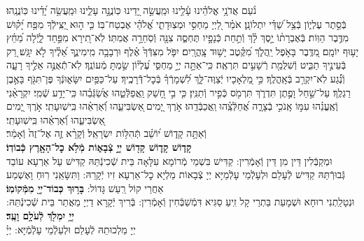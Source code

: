 \documentclass[twoside, openany, parskip=half, 11pt]{book}
\begin{document}
\begin{sometimes}
	
	
	\halfkaddish
	
	
	\label{vihi noam}
	
	נֹ֨עַם אֲדֹנָ֥י אֱלֹהֵ֗ינוּ עָ֫לֵ֥ינוּ וּמַֽעֲשֵׂ֣ה יָ֭דֵינוּ כּֽוֹנֲנָ֣ה עָלֵ֑ינוּ וּמַֽעֲשֵׂ֥ה יָ֝דֵ֗ינוּ כּֽוֹנֲנֵֽהוּ׃\\
	בְּֿסֵ֣תֶר עֶלְי֑וֹן בְּֿצֵ֥ל שַׁ֝דַּ֗י יִתְלוֹנָֽן׃
	אֹמַ֗ר לַ֭יְיָ מַחְסִ֣י וּמְצֽוּדָתִ֑י אֱ֝לֹהַ֗י אֶבְטַח־בּֽוֹ׃
	כִּ֤י ה֣וּא יַ֭צִּֽילְֿךָ מִפַּ֥ח יָ֝ק֗וּשׁ מִדֶּ֥בֶר הַוּֽוֹת׃
	בְּֿאֶבְרָת֨וֹ יָ֣סֶךְ לָ֗ךְ וְֿתַ֣חַת כְּֿנָפָ֣יו תֶּחְסֶ֑ה צִנָּ֖ה וְֿסֹֽחֵרָ֣ה אֲמִתּֽוֹ׃
	לֹֽא־תִ֭ירָא מִפַּ֣חַד לָ֑יְֿלָה מֵ֝חֵ֗ץ יָע֥וּף יוֹמָֽם׃
	מִ֭דֶּֽבֶר בָּאֹ֣פֶל יַֽהֲלֹ֑ךְ מִ֝קֶּ֗טֶב יָשׁ֥וּד צָֽהֳרָֽיִם׃
	יִפֹּ֤ל מִצִּדְּֿךָ֙ אֶ֗לֶף וּרְבָבָ֥ה מִֽימִינֶ֑ךָ אֵ֝לֶ֗יךָ לֹ֣א יִגָּֽשׁ׃
	רַ֭ק בְּֿעֵינֶ֣יךָ תַבִּ֑יט וְֿשִׁלֻּמַ֖ת רְֿשָׁעִ֣ים תִּרְאֶֽה׃
	כִּֽי־אַתָּ֣ה יְיָ֣ מַחְסִּ֑י עֶ֝לְי֗וֹן שַׂ֣מְתָּ מְֿעוֹנֶֽךָ׃
	לֹֽא־תְֿֿאֻנֶּ֣ה אֵלֶ֣יךָ רָעָ֑ה וְֿנֶ֗֝גַע לֹֽא־יִקְרַ֥ב בְּֿאָֽהֳלֶֽךָ׃
	כִּ֣י מַ֭לְאָכָיו יְֿצַוֶּה־לָּ֑ךְ לִ֝שְׁמָרְֿךָ֗ בְּֿכׇל־דְּֿֿרָכֶֽיךָ׃
	עַל־כַּפַּ֥יִם יִשָּׂא֑וּנְֿךָ פֶּן־תִּגֹּ֖ף בָּאֶ֣בֶן רַגְלֶֽךָ׃
	עַל־שַׁ֣חַל וָפֶ֣תֶן תִּדְרֹ֑ךְ תִּרְמֹ֖ס כְּֿפִ֣יר וְֿתַנִּֽין׃
	כִּ֤י בִ֣י חָ֭שַׁק וַֽאֲפַלְּֿטֵ֑הוּ אֲשַׂ֝גְּֿבֵ֗הוּ כִּֽי־יָדַ֥ע שְֿׁמִֽי׃
	יִקְרָאֵ֨נִי וְֽֿאֶֽעֱנֵ֗הוּ עִמּ֣וֹ אָֽנֹכִ֣י בְֿצָרָ֑ה אֲ֝חַלְּֿצֵֽ֗הוּ וַֽאֲכַבְּֿדֵֽהוּ׃
	אֹ֣רֶךְ יָ֭מִים ֖אַשְׂבִּיעֵ֑הוּ וְֿ֝אַרְאֵ֗הוּ בִּֽישֽׁוּעָתִֽי׃
	אֹ֣רֶךְ יָ֭מִים ֖אַשְׂבִּיעֵ֑הוּ וְֿ֝אַרְאֵ֗הוּ בִּֽישֽׁוּעָתִֽי׃\\
	\label{v ata kadosh}
	וְֿאַתָּ֥ה
	קָד֑וֹשׁ י֝וֹשֵׁ֗ב תְּֿהִלּ֥וֹת יִשְׂרָאֵֽל׃
	וְֿקָרָ֨א זֶ֤ה אֶל־זֶה֙ וְֿאָמַ֔ר׃\\
	\textbf{קָד֧וֹשׁ קָד֛וֹשׁ קָד֖וֹשׁ יְיָ֣ צְֿבָא֑וֹת מְֿלֹ֥א כׇל־הָאָ֖רֶץ כְּֿבוֹדֽוֹ׃}\\
	וּמְקַבְּֿלִין דֵּין מִן דֵּין וְֿאָמְֿרִין: קַדִּישׁ בִּשְׁמֵי מְֿרוֹמָא עִלָּאָה בֵּית שְֿׁכִינְֿתֵּהּ קַדִּישׁ עַל אַרְעָא עוֹבַד גְּֿבוּרְֿתֵּהּ קַדִּישׁ לְֿעָלַם וּלְעָלְֿמֵי עָלְֿמַיָּא יְיָ צְֿבָאוֹת מַלְיָא כׇל־אַרְעָא זִיו יְֿקָרֵהּ: וַתִּשָּׂאֵֽנִי רֽוּחַ וָאֶשְׁמַע אַחֲרַי קוֹל רַֽעַשׁ גָּדוֹל:
	\textbf{בָּר֥וּךְ כְּבוֹד־יְיָ֖ מִמְּֿקוֹמֽוֹ׃} \\
	וּנְטָלַֽתְנִי רוּחָא וּשְׁמָעֵת בַּתְרַי קָל זִֽיעַ סַגִּיא דִּמְֿשַׁבְּֿחִין וְֿאָמְֿרִין: בְּֿרִיךְ יְֿקָרָא דַיְיָ מֵאֲתַר בֵּית שְֿׁכִינְֿתֵּהּ:
	\textbf{יְיָ֥ יִמְלֹ֖ךְ לְֿעֹלָ֥ם וָעֶֽד׃} \\
	יְיָ מַלְכוּתֵהּ לְֿעָלַם וּלְעַלְֿמֵי עָלְֿמְֿיָּא: יְיָ֗

\end{sometimes}
\end{document}
